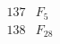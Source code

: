 \documentclass{article}
\begin{document}
{$$\begin{array}{|r|*{7}{r|}}
 & 
 & 
 & 
 & 
\\
\hline
137 
 & F_{5} &
 & 
 & 
 & 
 & 
 & 
\\
\hline
138 
 & F_{28} &
 & 
 & 
 & 
 & 
 & 

\end{array}$$}
\end{document}
